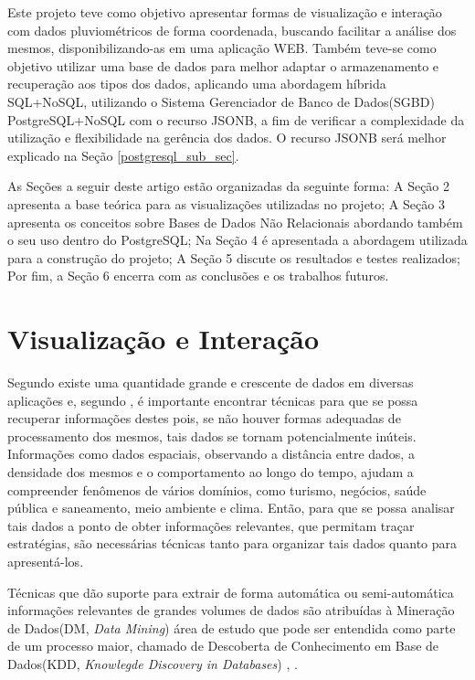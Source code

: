 \documentclass[article,11pt,oneside,a4paper]{abntex2} %
\begin{document}
	Este projeto teve como objetivo apresentar formas de visualização e interação com dados pluviométricos de forma coordenada, buscando facilitar a análise dos mesmos, disponibilizando-as em uma aplicação WEB. Também teve-se como objetivo utilizar uma base de dados para melhor adaptar o armazenamento e recuperação aos tipos dos dados, aplicando uma abordagem híbrida SQL+NoSQL, utilizando o Sistema Gerenciador de Banco de Dados(SGBD) PostgreSQL+NoSQL com o recurso JSONB, a fim de verificar a complexidade da utilização e flexibilidade na gerência dos dados. O recurso JSONB será melhor explicado na Seção \ref{postgresql_sub_sec}.
	
	As Seções a seguir deste artigo estão organizadas da seguinte forma:  A Seção 2 apresenta a base teórica para as visualizações utilizadas no projeto; A Seção 3 apresenta os conceitos sobre Bases de Dados Não Relacionais abordando também o seu uso dentro do PostgreSQL; Na Seção 4 é apresentada a abordagem utilizada para a construção do projeto; A Seção 5 discute os resultados e testes realizados; Por fim, a Seção 6 encerra com as conclusões e os trabalhos futuros.
	
	\section{Visualização e Interação}
		\hspace{13pt}
	Segundo  existe uma quantidade grande e crescente de dados em diversas aplicações e, segundo , é importante encontrar técnicas para que se possa recuperar informações destes pois, se não houver formas adequadas de processamento dos mesmos, tais dados se tornam potencialmente inúteis. Informações como dados espaciais, observando a distância entre dados, a densidade dos mesmos e o comportamento ao longo do tempo, ajudam a compreender fenômenos de vários domínios, como turismo, negócios, saúde pública e saneamento, meio ambiente e clima. Então, para que se possa analisar tais dados a ponto de obter informações relevantes, que permitam traçar estratégias, são necessárias técnicas tanto para organizar tais dados quanto para apresentá-los.
	
	Técnicas que dão suporte para extrair de forma automática ou semi-automática informações relevantes de grandes volumes de dados são atribuídas à Mineração de Dados(DM, \textit{Data Mining}) área de estudo que pode ser entendida como parte de um processo maior, chamado de Descoberta de Conhecimento em Base de Dados(KDD, \textit{Knowlegde Discovery in Databases}) \cite{fay1998}, \cite{fay1996}.
	
\end{document}
